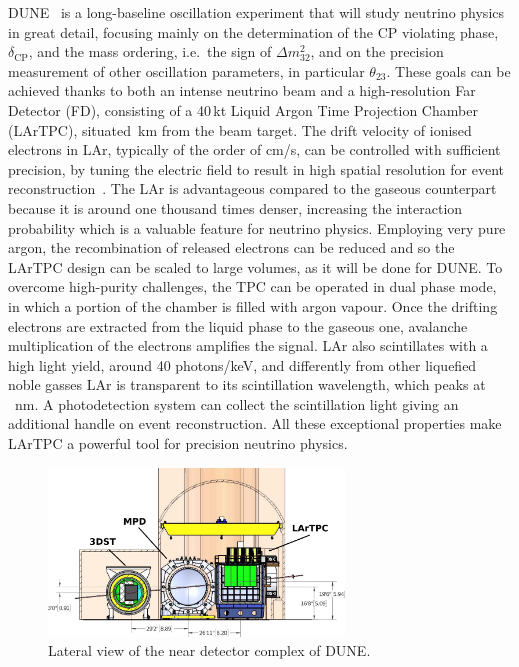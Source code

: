 DUNE~\cite{Abi:2018dnh} is a long-baseline oscillation experiment that %
will study neutrino physics in great detail, focusing mainly on the determination %
of the CP violating phase, $\delta_\text{CP}$, and the mass ordering, i.e.\ the sign of $\Delta m_{32}^2$, %
and on the precision measurement of other oscillation parameters, in particular $\theta_{23}$.
These goals can be achieved thanks to both an intense neutrino beam and a high-resolution Far Detector (FD), %
consisting of a 40\,kt Liquid Argon Time Projection Chamber (LArTPC), situated \,km from the beam target.
The drift velocity of ionised electrons in LAr, typically of the order of cm/\textmu s, %
can be controlled with sufficient precision, by tuning the electric field %
to result in high spatial resolution for event reconstruction~\cite{Rubbia:1977zz}.
The LAr is advantageous compared to the gaseous counterpart because it is around one thousand times denser, %
increasing the interaction probability which is a valuable feature for neutrino physics.
Employing very pure argon, the recombination of released electrons can be reduced and %
so the LArTPC design can be scaled to large volumes, as it will be done for DUNE.
To overcome high-purity challenges, the TPC can be operated in dual phase mode, in which a portion of the chamber is filled %
with argon vapour.
Once the drifting electrons are extracted from the liquid phase to the gaseous one, %
avalanche multiplication of the electrons amplifies the signal.
LAr also scintillates with a high light yield, around 40 photons/keV, and differently from other %
liquefied noble gasses LAr is transparent to its scintillation wavelength, which peaks at ~nm.
A photodetection system can collect the scintillation light giving an additional handle on event reconstruction.
All these exceptional properties make LArTPC a powerful tool for precision neutrino physics.

\begin{figure}
	\centering
	\includegraphics[width=0.7\textwidth]{pics/duneND.png}
	\caption[View of the near detector complex of DUNE]%
	{Lateral view of the near detector complex of DUNE.}
	\label{fig:duneND}
\end{figure}

